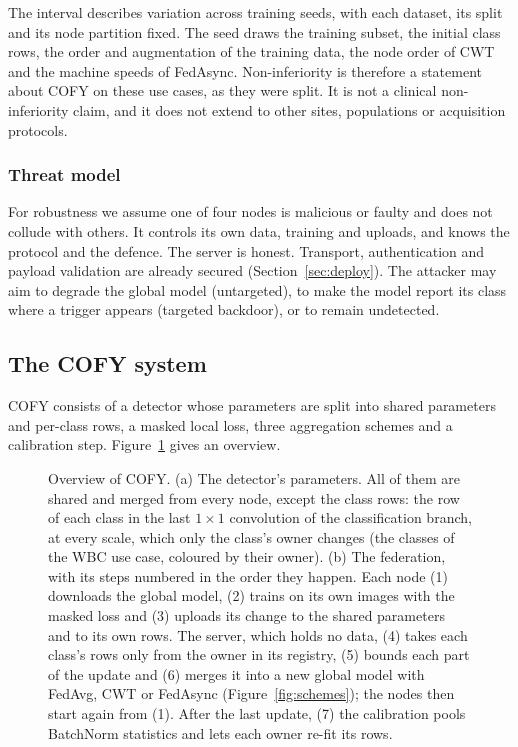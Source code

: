 \documentclass[pdflatex,sn-mathphys-num]{sn-jnl}
\newcommand{\sys}{COFY}
\begin{document}
The interval describes variation across training seeds, with each dataset, its split and its node partition fixed. The seed draws the training subset, the initial class rows, the order and augmentation of the training data, the node order of CWT and the machine speeds of FedAsync. Non-inferiority is therefore a statement about \sys{} on these use cases, as they were split. It is not a clinical non-inferiority claim, and it does not extend to other sites, populations or acquisition protocols.

\subsubsection{Threat model}\label{sec:threat}
For robustness we assume one of four nodes is malicious or faulty and does not collude with others. It controls its own data, training and uploads, and knows the protocol and the defence. The server is honest. Transport, authentication and payload validation are already secured (Section~\ref{sec:deploy}). The attacker may aim to degrade the global model (untargeted), to make the model report its class where a trigger appears (targeted backdoor), or to remain undetected.

\subsection{The \sys{} system}\label{sec:system}
\sys{} consists of a detector whose parameters are split into shared parameters and per-class rows, a masked local loss, three aggregation schemes and a calibration step. Figure~\ref{fig:architecture} gives an overview.

\begin{figure}[t]
\centering

\caption{Overview of \sys{}. (a) The detector's parameters. All of them are shared and merged from every node, except the class rows: the row of each class in the last $1\times1$ convolution of the classification branch, at every scale, which only the class's owner changes (the classes of the WBC use case, coloured by their owner). (b) The federation, with its steps numbered in the order they happen. Each node (1) downloads the global model, (2) trains on its own images with the masked loss and (3) uploads its change to the shared parameters and to its own rows. The server, which holds no data, (4) takes each class's rows only from the owner in its registry, (5) bounds each part of the update and (6) merges it into a new global model with FedAvg, CWT or FedAsync (Figure~\ref{fig:schemes}); the nodes then start again from (1). After the last update, (7) the calibration pools BatchNorm statistics and lets each owner re-fit its rows.}\label{fig:architecture}
\end{figure}
\end{document}
